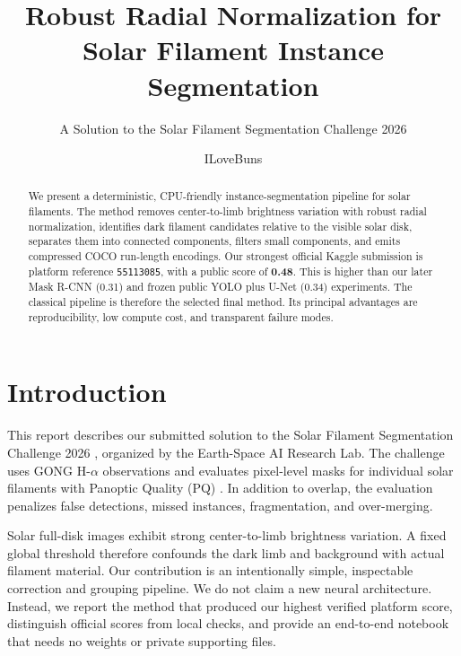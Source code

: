 \documentclass[sigconf]{acmart}
\begin{document}
\title{Robust Radial Normalization for Solar Filament Instance Segmentation}
\subtitle{A Solution to the Solar Filament Segmentation Challenge 2026}
\author{ILoveBuns}

\begin{abstract}
We present a deterministic, CPU-friendly instance-segmentation pipeline for
solar filaments. The method removes center-to-limb brightness variation with
robust radial normalization, identifies dark filament candidates relative to
the visible solar disk, separates them into connected components, filters small
components, and emits compressed COCO run-length encodings. Our strongest
official Kaggle submission is platform reference \texttt{55113085}, with a
public score of \textbf{0.48}. This is higher than our later Mask R-CNN (0.31)
and frozen public YOLO plus U-Net (0.34) experiments. The classical pipeline is
therefore the selected final method. Its principal advantages are
reproducibility, low compute cost, and transparent failure modes.
\end{abstract}
\maketitle

\section{Introduction}
This report describes our submitted solution to the Solar Filament
Segmentation Challenge 2026 \cite{competition}, organized by the Earth-Space AI
Research Lab. The challenge uses GONG H-$\alpha$ observations and evaluates
pixel-level masks for individual solar filaments with Panoptic Quality (PQ)
\cite{kirillov2019panoptic}. In addition to overlap, the evaluation penalizes
false detections, missed instances, fragmentation, and over-merging.

Solar full-disk images exhibit strong center-to-limb brightness variation. A
fixed global threshold therefore confounds the dark limb and background with
actual filament material. Our contribution is an intentionally simple,
inspectable correction and grouping pipeline. We do not claim a new neural
architecture. Instead, we report the method that produced our highest verified
platform score, distinguish official scores from local checks, and provide an
end-to-end notebook that needs no weights or private supporting files.
\end{document}
